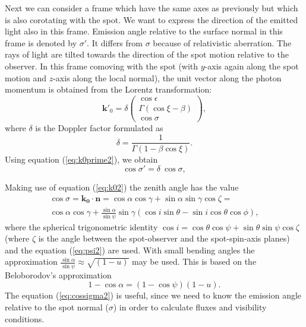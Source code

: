 \documentclass{wihuri}
\def\be{\begin{equation}}
\def\ee{\end{equation}}
\def\Dop{\delta}
\newcommand{\bmath}[1]{\boldsymbol{#1}}
\begin{document}

Next we can consider a frame which have the same axes as previously but which is also corotating with the spot. We want to express the direction of the emitted light also in this frame. Emission angle relative to the surface normal in this frame is denoted by
$\sigma'$.  It differs from $\sigma$ because of relativistic aberration. The rays of light are tilted towards the direction of the spot motion relative to the observer.
In this frame comoving with the spot 
(with $y$-axis again along the spot motion and $z$-axis along the local normal), 
the unit vector along the photon momentum  is 
obtained from the Lorentz transformation: 
\be \label{eq:k0prime2}
\bmath{k}'_0 = \Dop
\left( \begin{array}{c}
\cos \epsilon \\
\Gamma (\cos\xi-\beta)\\ 
\cos\sigma
\end{array}
\right) ,
\ee 
where $\delta$ is the Doppler factor formulated as
\be \label{eq:dop2}
\Dop=\frac{1}{\Gamma(1-\beta\cos\xi)} .
\ee
Using equation (\ref{eq:k0prime2}), we obtain
\be \label{eq:aberr2}
\cos\sigma' =   \Dop \ \cos\sigma ,
\ee
 
Making use of equation (\ref{eq:k02}) the zenith angle has the value
\be\label{eq:cossigma2}
\begin{split}
\cos\sigma = \bmath{k_{0}}\cdot\bmath{n} = \cos\alpha\cos\gamma+\sin\alpha\sin\gamma\cos\zeta = \\
\cos \alpha  \cos \gamma + \frac{\sin \alpha}{\sin \psi} \sin \gamma (\cos i \sin \theta - \sin i \cos \theta \cos \phi),
\end{split}
\ee
where the spherical trigonometric identity $\cos i = \cos\theta\cos\psi+\sin\theta\sin\psi\cos\zeta$ (where $\zeta$ is the angle between the spot-observer and the spot-spin-axis planes) and the equation (\ref{eq:psi2}) are used. With small bending angles the approximation $\frac{\sin \alpha}{\sin \psi} \approx \sqrt{(1-u)}$ may be used. This is based on the Beloborodov's approximation  \cite{beloborodov}
\be \label{eq:beloborodov}
1-\cos \alpha = (1 - \cos \psi)(1 - u).
\ee
The equation (\ref{eq:cossigma2}) is useful, since we need to know the emission angle relative to the spot normal ($\sigma$) in order to calculate fluxes and visibility conditions. 
\end{document}
